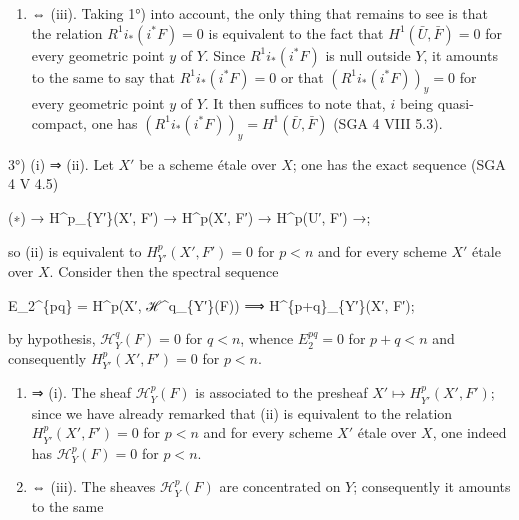 \documentclass[
]{article}
\newenvironment{Shaded}{}{}
\newcommand{\NormalTok}[1]{#1}
\providecommand{\tightlist}{%
  \setlength{\itemsep}{0pt}\setlength{\parskip}{0pt}}
\begin{document}
\begin{enumerate}
\def\labelenumi{(\roman{enumi})}
\tightlist
\item
  ⇔ (iii). Taking 1°) into account, the only thing that remains to see
  is that the relation \(R^{1} i_{*} (i^{*} F) = 0\) is equivalent to
  the fact that \(H^{1}(\bar{U}, \bar{F}) = 0\) for every geometric
  point \(y\) of \(Y\). Since \(R^{1} i_{*} (i^{*} F)\) is null outside
  \(Y\), it amounts to the same to say that
  \(R^{1} i_{*} (i^{*} F) = 0\) or that
  \((R^{1} i_{*} (i^{*} F))_{y} = 0\) for every geometric point \(y\) of
  \(Y\). It then suffices to note that, \(i\) being quasi-compact, one
  has \((R^{1} i_{*} (i^{*} F))_{y} = H^{1}(\bar{U}, \bar{F})\) (SGA 4
  VIII 5.3).
\end{enumerate}

3°) (i) ⇒ (ii). Let \(X'\) be a scheme étale over \(X\); one has the
exact sequence (SGA 4 V 4.5)

\begin{Shaded}
\begin{Highlighting}[]
\NormalTok{(∗)    → H\^{}p\_\{Y′\}(X′, F′) → H\^{}p(X′, F′) → H\^{}p(U′, F′) →;}
\end{Highlighting}
\end{Shaded}

so (ii) is equivalent to \(H^{p}_{Y'}(X', F') = 0\) for \(p < n\) and
for every scheme \(X'\) étale over \(X\). Consider then the spectral
sequence

\begin{Shaded}
\begin{Highlighting}[]
\NormalTok{E\_2\^{}\{pq\} = H\^{}p(X′, ℋ\^{}q\_\{Y′\}(F)) ⟹ H\^{}\{p+q\}\_\{Y′\}(X′, F′);}
\end{Highlighting}
\end{Shaded}

by hypothesis, \(\mathcal{H}^{q}_{Y}(F) = 0\) for \(q < n\), whence
\(E^{pq}_{2} = 0\) for \(p + q < n\) and consequently
\(H^{p}_{Y'}(X', F') = 0\) for \(p < n\).

\begin{enumerate}
\def\labelenumi{(\roman{enumi})}
\setcounter{enumi}{1}
\item
  ⇒ (i). The sheaf \(\mathcal{H}^{p}_{Y}(F)\) is associated to the
  presheaf \(X' \mapsto H^{p}_{Y'}(X', F')\); since we have already
  remarked that (ii) is equivalent to the relation
  \(H^{p}_{Y'}(X', F') = 0\) for \(p < n\) and for every scheme \(X'\)
  étale over \(X\), one indeed has \(\mathcal{H}^{p}_{Y}(F) = 0\) for
  \(p < n\).
\item
  ⇔ (iii). The sheaves \(\mathcal{H}^{p}_{Y}(F)\) are concentrated on
  \(Y\); consequently it amounts to the same
\end{enumerate}
\end{document}
